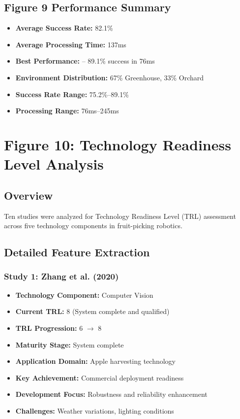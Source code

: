 \documentclass[11pt]{article}
\begin{document}
\subsection{Figure 9 Performance Summary}
\begin{itemize}
    \item \textbf{Average Success Rate:} 82.1\%
    \item \textbf{Average Processing Time:} 137ms
    \item \textbf{Best Performance:} \cite{arad2020development} -- 89.1\% success in 76ms
    \item \textbf{Environment Distribution:} 67\% Greenhouse, 33\% Orchard
    \item \textbf{Success Rate Range:} 75.2\%--89.1\%
    \item \textbf{Processing Range:} 76ms--245ms
\end{itemize}

\section{Figure 10: Technology Readiness Level Analysis}

\subsection{Overview}
Ten studies were analyzed for Technology Readiness Level (TRL) assessment across five technology components in fruit-picking robotics.

\subsection{Detailed Feature Extraction}

\subsubsection{Study 1: Zhang et al. (2020) \cite{zhang2020technology}}
\begin{itemize}
    \item \textbf{Technology Component:} Computer Vision
    \item \textbf{Current TRL:} 8 (System complete and qualified)
    \item \textbf{TRL Progression:} 6 $\rightarrow$ 8
    \item \textbf{Maturity Stage:} System complete
    \item \textbf{Application Domain:} Apple harvesting technology
    \item \textbf{Key Achievement:} Commercial deployment readiness
    \item \textbf{Development Focus:} Robustness and reliability enhancement
    \item \textbf{Challenges:} Weather variations, lighting conditions
\end{itemize}
\end{document}
